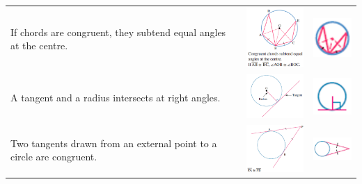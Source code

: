 \documentclass[a4paper,10pt]{report}
\begin{document}
\begin{center}
\begin{tabular}[center]{p{5cm}|p{3cm}|p{2cm}}
		If chords are congruent, they subtend equal angles at the centre.                                                                                                                              & \includegraphics[width=3cm]{circle theorem 7}  & \includegraphics[width=2cm]{circle theorem 7 symbol}  \\
		A tangent and a radius intersects at right angles.                                                                                                                                             & \includegraphics[width=3cm]{circle theorem 8}  & \includegraphics[width=2cm]{circle theorem 8 symbol}  \\
		Two tangents drawn from an external point to a circle are congruent.                                                                                                                           & \includegraphics[width=3cm]{circle theorem 9}  & \includegraphics[width=2cm]{circle theorem 9 symbol}  \\

\end{tabular}
\end{center}
\end{document}
